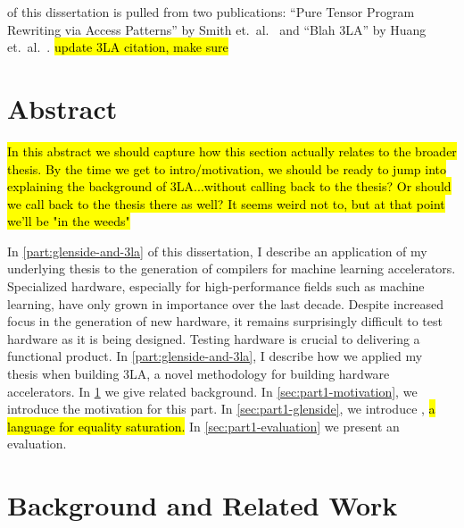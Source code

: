   of this dissertation
  is pulled from two publications:
``Pure Tensor Program Rewriting via Access Patterns'' by Smith et.~al.~\cite{smith2021pure} and ``Blah 3LA'' by Huang et.~al.~\cite{huang2022specialized}. \hl{update 3LA citation, make sure}

\chapter*{ Abstract}

\hl{
In this abstract we should capture 
  how this section actually relates
  to the broader thesis.
By the time we get to intro/motivation,
  we should be ready
  to jump into explaining the background
  of 3LA...without calling back to the thesis?
Or should we call back to the thesis there as well?
It seems weird not to,
  but at that point we'll be "in the weeds"
}

In \cref{part:glenside-and-3la} of this dissertation,
  I describe an application of my underlying thesis
  to the generation of compilers
  for machine learning accelerators.
Specialized hardware, especially for high-performance fields
  such as machine learning,
  have only grown in importance
  over the last decade.
Despite increased focus
  in the generation of new hardware,
  it remains surprisingly difficult
  to test hardware
  as it is being designed.
Testing hardware is crucial
  to delivering a functional product.
In \cref{part:glenside-and-3la},
  I describe how we applied
  my thesis
  when building 3LA,
  a novel methodology
  for building hardware accelerators.
In \cref{sec:part1-background}
  we give related background.
In \cref{sec:part1-motivation},
  we introduce the
  motivation for this part.
In \cref{sec:part1-glenside},
  we introduce \g,
  \hl{a language for equality saturation.}
In \cref{sec:part1-evaluation}
  we present an evaluation.

  
\chapter{Background and Related Work}
\label{sec:part1-background}



